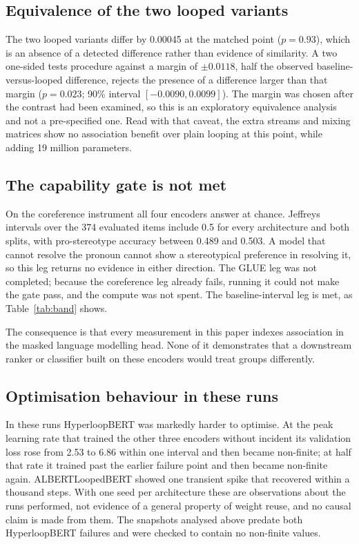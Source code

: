 \documentclass[sigconf,natbib=true,anonymous=true]{acmart}
\begin{document}
\subsection{Equivalence of the two looped variants}

The two looped variants differ by 0.00045 at the matched point ($p = 0.93$),
which is an absence of a detected difference rather than evidence of similarity.
A two one-sided tests procedure against a margin of $\pm 0.0118$, half the
observed baseline-versus-looped difference, rejects the presence of a difference
larger than that margin ($p = 0.023$; 90\% interval $[-0.0090, 0.0099]$). The
margin was chosen after the contrast had been examined, so this is an exploratory
equivalence analysis and not a pre-specified one. Read with that caveat, the
extra streams and mixing matrices show no association benefit over plain looping
at this point, while adding 19 million parameters.

\subsection{The capability gate is not met}
\label{sec:capability}

On the coreference instrument all four encoders answer at chance. Jeffreys
intervals over the 374 evaluated items include 0.5 for every architecture and
both splits, with pro-stereotype accuracy between 0.489 and 0.503. A model that
cannot resolve the pronoun cannot show a stereotypical preference in resolving
it, so this leg returns no evidence in either direction. The GLUE leg was not
completed; because the coreference leg already fails, running it could not make
the gate pass, and the compute was not spent. The baseline-interval leg is met,
as Table~\ref{tab:band} shows.

The consequence is that every measurement in this paper indexes association in
the masked language modelling head. None of it demonstrates that a downstream
ranker or classifier built on these encoders would treat groups differently.

\subsection{Optimisation behaviour in these runs}
\label{sec:stability}

In these runs HyperloopBERT was markedly harder to optimise. At the peak learning
rate that trained the other three encoders without incident its validation loss
rose from 2.53 to 6.86 within one interval and then became non-finite; at half
that rate it trained past the earlier failure point and then became non-finite
again. ALBERTLoopedBERT showed one transient spike that recovered within a
thousand steps. With one seed per architecture these are observations about the
runs performed, not evidence of a general property of weight reuse, and no causal
claim is made from them. The snapshots analysed above predate both HyperloopBERT
failures and were checked to contain no non-finite values.
\end{document}

